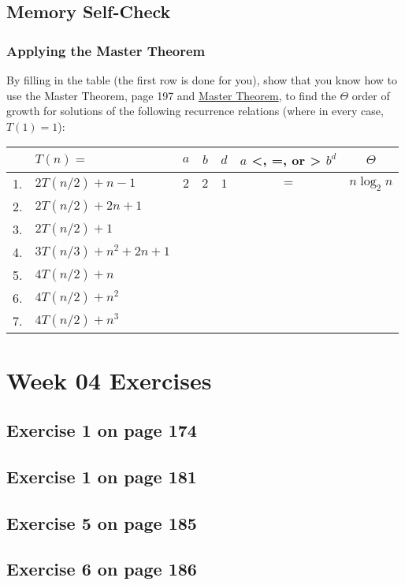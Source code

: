 \documentclass[12pt]{amsart}
\begin{document}
\subsection{Memory Self-Check}

\subsubsection{Applying the Master Theorem}


By filling in the table (the first row is done for you), show that you know
  how to use the Master Theorem, page 197 and \href{run:../support_files/master_theorem.pdf}{Master Theorem}, to find the $\Theta$ order of growth for solutions of the following recurrence relations (where in every case, $T(1) = 1$):
  \\
\begin{tabular}{|c|l|c|c|c|c|c|}
\hline
    &$T(n) =$           & $a$ & $b$ & $d$ & $a$ <, =, or > $b^d$ & $\Theta$ \\
\hline
1. & $2T(n/2)+n-1$ & $2$ & $2$ & $1$ & $=$ & $n\log_2 n$ \\
\hline
2. & $2T(n/2)+2n+1$ &  &  & & &  \\
\hline
3. & $2T(n/2)+1$ &  &  & & &  \\
\hline
4. & $3T(n/3)+n^2+2n+1$ &  &  & & &  \\
\hline
5. & $4T(n/2)+n$ &  &  & & &  \\
\hline
6. & $4T(n/2)+n^2$ &  &  & & &  \\
\hline
7. & $4T(n/2)+n^3$ &  &  & & &  \\
\hline
\end{tabular}
 \section{Week 04 Exercises}
\subsection{ Exercise 1 on page 174} 
\subsection{Exercise 1 on page 181} 
\subsection{Exercise 5 on page 185} 
\subsection{Exercise 6 on page 186} 
\end{document}
